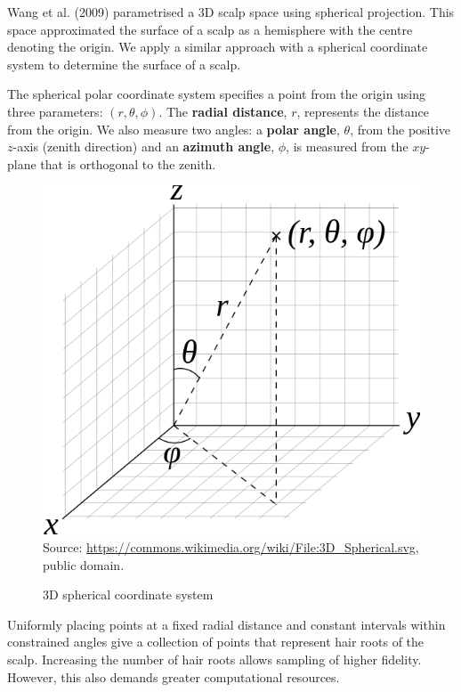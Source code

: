 \documentclass[ %
author={Dillon Keith Diep},
supervisor={Dr. Carl Henrik Ek},
degree={MEng},
title={ART-CG:},
subtitle={Assisted Real-time Content Generation of 3D Hair by Learning Manifolds},
type={Research},
year={2017} ]{dissertation}
\begin{document}
Wang et al. (2009) parametrised a 3D scalp space using spherical projection. \cite{examplebasedhair} This space approximated the surface of a scalp as a hemisphere with the centre denoting the origin. We apply a similar approach with a spherical coordinate system to determine the surface of a scalp.

The spherical polar coordinate system specifies a point from the origin using three parameters:  $(r,\theta,\phi)$. \cite[pp.123-126]{sphericalcoords} The \textbf{radial distance}, $r$, represents the distance from the origin. We also measure two angles: a \textbf{polar angle}, $\theta$, from the positive $z$-axis (zenith direction) and an \textbf{azimuth angle}, $\phi$, is measured from the $xy$-plane that is orthogonal to the zenith.

\begin{figure}[!h]
	\centering
	\includegraphics[scale=0.25]{images/sphereCoords}\\
	\tiny{Source: \href{https://commons.wikimedia.org/wiki/File:3D_Spherical.svg}{https://commons.wikimedia.org/wiki/File:3D\_Spherical.svg}, public domain.}
	\caption{3D spherical coordinate system}
\end{figure}

Uniformly placing points at a fixed radial distance and constant intervals within constrained angles give a collection of points that represent hair roots of the scalp. Increasing the number of hair roots allows sampling of higher fidelity. However, this also demands greater computational resources.
\end{document}
